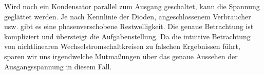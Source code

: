 Wird noch ein Kondensator parallel zum Ausgang geschaltet, kann die Spannung
geglättet werden. Je nach Kennlinie der Dioden, angeschlossenem Verbraucher
usw. gibt es eine phasenverschobene Restwelligkeit. Die genaue Betrachtung ist
kompliziert und übersteigt die Aufgabenstellung. Da die intuitive Betrachtung
von nichtlinearen Wechselstromschaltkreisen zu falschen Ergebnissen führt,
sparen wir uns irgendwelche Mutmaßungen über das genaue Aussehen der
Ausgangsspannung in diesem Fall.
